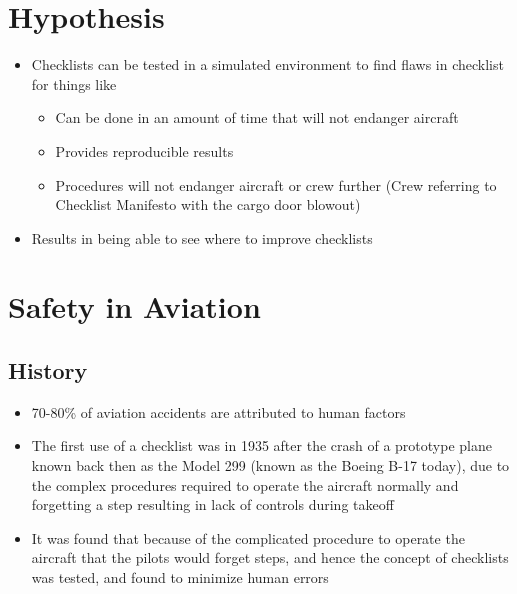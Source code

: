 \documentclass[../dissertation.tex]{subfiles}
\begin{document}
\section{Hypothesis}
\begin{itemize}
    \item Checklists can be tested in a simulated environment 
      to find flaws in checklist for things like
      \begin{itemize}
        \item Can be done in an amount of time that will not endanger aircraft
        \item Provides reproducible results
        \item Procedures will not endanger aircraft or crew further (Crew referring to Checklist Manifesto with the cargo door blowout)
      \end{itemize}
    \item Results in being able to see where to improve checklists
\end{itemize}



\section{Safety in Aviation}
\subsection{History}
\begin{itemize}
  \item 70-80\% of aviation accidents are attributed to human factors~\cite{faa:reasons}
  \item The first use of a checklist was in 1935 after the crash of a prototype plane known
    back then as the Model 299 (known as the Boeing B-17 today), due to the complex procedures
    required to operate the aircraft normally and forgetting a step resulting in
    lack of controls during takeoff~\cite{manifesto}
  \item It was found that because of the complicated procedure to operate the aircraft
    that the pilots would forget steps, and hence the concept of checklists was tested,
    and found to minimize human errors~\cite{manifesto}
\end{itemize}
\end{document}
